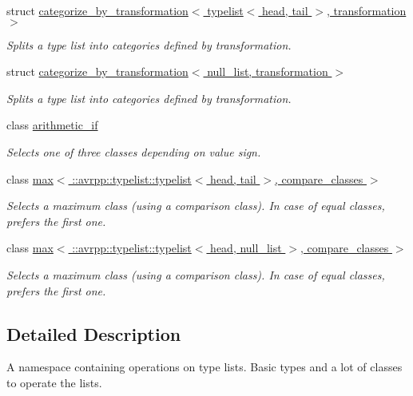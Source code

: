 \begin{DoxyCompactItemize}
struct \hyperlink{structavrpp_1_1typelist_1_1categorize__by__transformation_3_01typelist_3_01head_00_01tail_01_4_00_01transformation_01_4}{categorize\_\-by\_\-transformation$<$ typelist$<$ head, tail $>$, transformation $>$}
\begin{DoxyCompactList}\small\item\em Splits a type list into categories defined by transformation. \item\end{DoxyCompactList}\item 
struct \hyperlink{structavrpp_1_1typelist_1_1categorize__by__transformation_3_01null__list_00_01transformation_01_4}{categorize\_\-by\_\-transformation$<$ null\_\-list, transformation $>$}
\begin{DoxyCompactList}\small\item\em Splits a type list into categories defined by transformation. \item\end{DoxyCompactList}\item 
class \hyperlink{classavrpp_1_1typelist_1_1arithmetic__if}{arithmetic\_\-if}
\begin{DoxyCompactList}\small\item\em Selects one of three classes depending on value sign. \item\end{DoxyCompactList}\item 
class \hyperlink{classavrpp_1_1typelist_1_1max_3_01_1_1avrpp_1_1typelist_1_1typelist_3_01head_00_01tail_01_4_00_01compare__classes_01_4}{max$<$ ::avrpp::typelist::typelist$<$ head, tail $>$, compare\_\-classes $>$}
\begin{DoxyCompactList}\small\item\em Selects a maximum class (using a comparison class). In case of equal classes, prefers the first one. \item\end{DoxyCompactList}\item 
class \hyperlink{classavrpp_1_1typelist_1_1max_3_01_1_1avrpp_1_1typelist_1_1typelist_3_01head_00_01null__list_01_4_00_01compare__classes_01_4}{max$<$ ::avrpp::typelist::typelist$<$ head, null\_\-list $>$, compare\_\-classes $>$}
\begin{DoxyCompactList}\small\item\em Selects a maximum class (using a comparison class). In case of equal classes, prefers the first one. \item\end{DoxyCompactList}\end{DoxyCompactItemize}


\subsection{Detailed Description}
A namespace containing operations on type lists. Basic types and a lot of classes to operate the lists. 